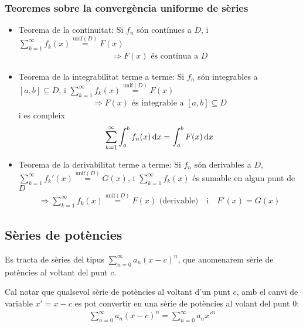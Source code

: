 \subsubsection*{Teoremes sobre la convergència uniforme de sèries}
\begin{itemize}
    \item Teorema de la continuitat:
        \subitem Si $f_{n}$ són contínues a $D$, i $\sum_{k = 1}^{\infty} f_{k} (x) \overset{\text{unif}(D)}{=} F(x)$
        \begin{align}
            \Rightarrow F(x) \text{ és contínua a } D
        \end{align}
    \item Teorema de la integrabilitat terme a terme:
        \subitem Si $f_{n}$ són integrables a $[a, b] \subseteq D$, i $\sum_{k = 1}^{\infty} f_{k} (x) \overset{\text{unif}(D)}{=} F(x)$
        \begin{align}
            \Rightarrow F(x) \text{ és integrable a } [a, b] \subseteq D
        \end{align}
        \subitem i es compleix
        \begin{align}
            \sum\limits_{k = 1}^{\infty} \int_{a}^{b} f_{n} (x) \mathop{}\!\mathrm{d} x = \int_{a}^{b} F(x) \mathop{}\!\mathrm{d} x
        \end{align}
    \item Teorema de la derivabilitat terme a terme:
        \subitem Si $f_{n}$ són derivables a $D$, $\sum_{k = 1}^{\infty} f_{k}' (x) \overset{\text{unif}(D)}{=} G(x)$, i $\sum_{k = 1}^{\infty} f_{k} (x)$ és sumable en algun punt de $D$
        \begin{align}
            \Rightarrow \sum\limits_{k = 1}^{\infty} f_{k} (x) \overset{\text{unif}(D)}{=} F(x) \text{ (derivable)} \quad \text{i} \quad F'(x) = G(x)
        \end{align}
\end{itemize}

\subsection{Sèries de potències}
Es tracta de sèries del tipus $\displaystyle \sum\limits_{n=0}^{\infty} a_{n} (x-c)^{n}$, que anomenarem sèrie de potències al voltant del punt $c$.

Cal notar que qualsevol sèrie de potències al voltant d'un punt $c$, amb el canvi de variable $x' = x-c$ es pot convertir en una sèrie de potències al volant del punt $0$:
\begin{align}
    \sum\limits_{n=0}^{\infty} a_{n} (x-c)^{n} = \sum\limits_{n=0}^{\infty} a_{n} x'^{n}
\end{align}


